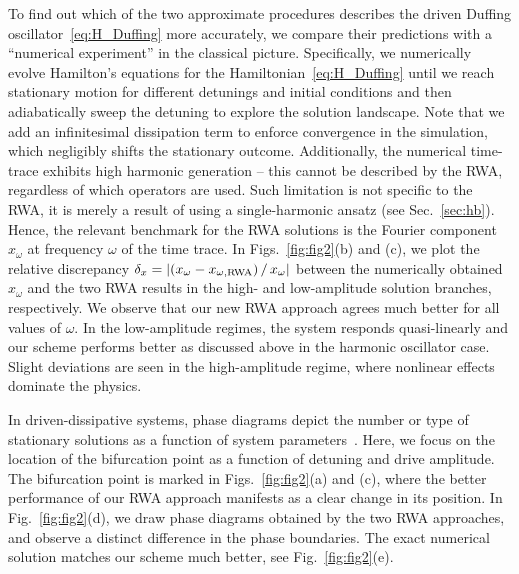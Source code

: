 To find out which of the two approximate procedures describes the driven Duffing oscillator~\eqref{eq:H_Duffing} more accurately, we compare their predictions with a ``numerical experiment'' in the classical picture. Specifically, we numerically evolve Hamilton's equations for the Hamiltonian~\eqref{eq:H_Duffing} until we reach stationary motion for different detunings and initial conditions and then adiabatically sweep the detuning to explore the solution landscape. Note that we add an infinitesimal dissipation term to enforce convergence in the simulation, which negligibly shifts the stationary outcome. 
Additionally, the numerical time-trace exhibits high harmonic generation -- this cannot be described by the RWA, regardless of which operators are used. Such limitation is not specific to the RWA, it is merely a result of using a single-harmonic ansatz (see Sec.~\ref{sec:hb}). Hence, the relevant benchmark for the RWA solutions is the Fourier component $x_\omega$ at frequency $\omega$ of the time trace. In Figs.~\ref{fig:fig2}(b) and (c), we plot the relative discrepancy $\delta_x = \abs{(x_\omega - x_{\omega, \text{RWA}})\, /\, x_\omega}$ between the numerically obtained $x_\omega$ and the two RWA results in the high- and low-amplitude solution branches, respectively. We observe that our new RWA approach agrees much better for all values of $\omega$. In the low-amplitude regimes, the system responds quasi-linearly and our scheme performs better as discussed above in the harmonic oscillator case. Slight deviations are seen in the high-amplitude regime, where nonlinear effects dominate the physics.

In driven-dissipative systems, phase diagrams depict the number or type of stationary solutions as a function of system parameters~\cite{Soriente_2018, Chitra_2015}. Here, we focus on the location of the bifurcation point as a function of detuning and drive amplitude.
The bifurcation point is marked in Figs.~\ref{fig:fig2}(a) and (c), where the better performance of our RWA approach manifests as a clear change in its position. In Fig.~\ref{fig:fig2}(d), we draw phase diagrams obtained by the two RWA approaches, and observe a distinct difference in the phase boundaries. The exact numerical solution matches our scheme much better, see Fig.~\ref{fig:fig2}(e).

